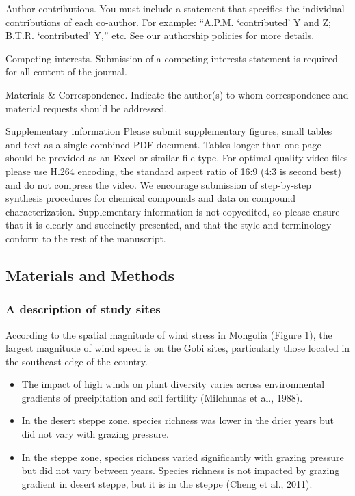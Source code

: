 \documentclass[
  11pt,
]{article}
\providecommand{\tightlist}{%
  \setlength{\itemsep}{0pt}\setlength{\parskip}{0pt}}
\begin{document}
Author contributions. You must include a statement that specifies the
individual contributions of each co-author. For example: ``A.P.M.
`contributed' Y and Z; B.T.R. `contributed' Y,'' etc. See our authorship
policies for more details.

Competing interests. Submission of a competing interests statement is
required for all content of the journal.

Materials \& Correspondence. Indicate the author(s) to whom
correspondence and material requests should be addressed.

Supplementary information Please submit supplementary figures, small
tables and text as a single combined PDF document. Tables longer than
one page should be provided as an Excel or similar file type. For
optimal quality video files please use H.264 encoding, the standard
aspect ratio of 16:9 (4:3 is second best) and do not compress the video.
We encourage submission of step-by-step synthesis procedures for
chemical compounds and data on compound characterization. Supplementary
information is not copyedited, so please ensure that it is clearly and
succinctly presented, and that the style and terminology conform to the
rest of the manuscript.

\subsection{Materials and Methods}\label{materials-and-methods-1}

\subsubsection{A description of study
sites}\label{a-description-of-study-sites}

According to the spatial magnitude of wind stress in Mongolia (Figure
1), the largest magnitude of wind speed is on the Gobi sites,
particularly those located in the southeast edge of the country.

\begin{itemize}
\tightlist
\item
  The impact of high winds on plant diversity varies across
  environmental gradients of precipitation and soil fertility (Milchunas
  et al., 1988).
\item
  In the desert steppe zone, species richness was lower in the drier
  years but did not vary with grazing pressure.
\item
  In the steppe zone, species richness varied significantly with grazing
  pressure but did not vary between years. Species richness is not
  impacted by grazing gradient in desert steppe, but it is in the steppe
  (Cheng et al., 2011).
\end{itemize}
\end{document}
